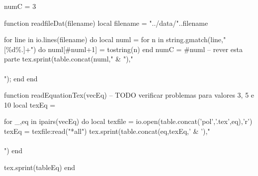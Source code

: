 

\begin{luacode}
  numC = 3

  function readfileDat(filename)
    local filename = "../data/"..filename

    for line in io.lines(filename) do
        local numl = {}
        for n in string.gmatch(line,"[\%d\%.]+") do
          numl[#numl+1] = tostring(n)
        end
        numC = #numl -- rever esta parte
        tex.sprint(table.concat(numl," & ")," \\\\");
    end
  end
\end{luacode}

\newcommand{\luaTable}[4][\directlua{tex.print(numC)}]
{
  \begin{table}[H]
  \centering
  \caption{#3}
  \begin{tabular}{*{#1}{c}}
  \hline
  #4\\
  \hline
  \directlua{readfileDat('#2')}
  \hline
  \end{tabular}
  \end{table}
}


\begin{luacode}
  function readEquationTex(vecEq)
    -- TODO verificar problemas para valores 3, 5 e 10
    local texEq = {}

    for _,eq in ipairs(vecEq) do
      local texfile = io.open(table.concat({'pol','.tex'},eq),'r')
      texEq = texfile:read("*all")
      tex.sprint(table.concat({eq,texEq},' & ')," \\\\")
    end

    tex.sprint(tableEq)
  end
\end{luacode}

\newcommand{\polyTable}[3][tbPoly]
{
  \begin{table}[H]
    \label{#1}
    \centering
    \caption{#3}
    \begin{tabular}{l p{10cm}}
      \hline
      $i$ & $f_i(x)$\\
      \hline
      \directlua{readEquationTex({#2})}
      \hline
    \end{tabular}
  \end{table}
}

